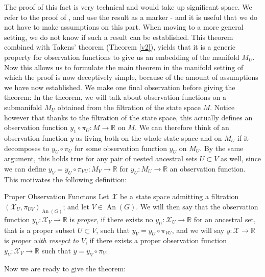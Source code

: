 \documentclass[11pt, a4paper]{memoir}
\theoremstyle{break}
\theoremstyle{break}
\theoremstyle{nonumberplain}
\newcommand{\mR}{\mathbb{R}}
\DeclareMathOperator{\an}{An}
\begin{document}
The proof of this fact is very technical and would take up significant space. We refer to the proof of \cite{mathFound}, and use the result as a marker - and it is useful that we do not have to make assumptions on this part. When moving to a more general setting, we do not know if such a result can be established. This theorem combined with Takens' theorem (Theorem \ref{v2}), yields that it is a generic property for observation functions to give us an embedding of the manifold $M_U$. Now this allows us to formulate the main theorem in the manifold setting of which the proof is now deceptively simple, because of the amount of assumptions we have now established. We make one final observation before giving the theorem:
In the theorem, we will talk about observation functions on a submanifold $M_U$ obtained from the filtration of the state space $M$. Notice however that thanks to the filtration of the state space, this actually defines an observation function $y_1\circ\pi_U:M\to \mR$ on $M$. We can therefore think of an observation function $y$ as living both on the whole state space and on $M_U$ if it decomposes to $y_U\circ \pi_{U}$ for some observation function $y_U$ on $M_U$. By the same argument, this holds true for any pair of nested ancestral sets $U\subset V$ as well, since we can define $y_V=y_U\circ \pi_{VU}:M_V\to \mR$ for $y_U:M_U\to \mR$ an observation function. This motivates the following definition:
\begin{mydefinition}{Proper Observation Functons}
Let $\mathcal{X}$ be a state space admitting a filtration $(\mathcal{X}_U, \pi_{UV})_{\an(G)}$; and let $V\in \an(G)$. We will then say that the observation function $y_V:\mathcal{X}_V\to \mR$ is \emph{proper}, if there exists no $y_U:\mathcal{X}_U\to \mR$ for an ancestral set, that is a proper subset $U\subset V$, such that $y_V=y_U\circ\pi_{VU}$, and we will say $y:\mathcal{X}\to \mR$ is \emph{proper with resepct to $V$}, if there exists a proper observation function $y_V:\mathcal{X}_V\to \mR$ such that $y=y_V\circ\pi_V$.
\end{mydefinition}
Now we are ready to give the theorem:
\end{document}
